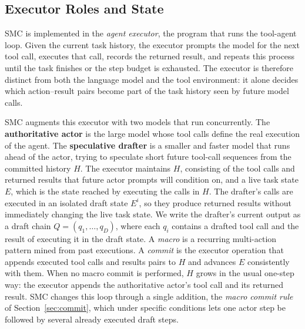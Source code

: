 \subsection{Executor Roles and State}

SMC is implemented in the \emph{agent executor}, the program that runs the tool-agent loop. 
Given the current task history, the executor prompts the model for the next tool call, executes that call, records the returned result, and repeats this process until the task finishes or the step budget is exhausted. The executor is therefore distinct from both the language model and the tool environment: it alone decides which action–result pairs become part of the task history seen by future model calls.

SMC augments this executor with two models that run concurrently. 
The \textbf{authoritative actor} is the large model whose tool calls define the real execution of the agent.  
The \textbf{speculative drafter} is a smaller and faster model that runs ahead of the actor, trying to speculate short future tool-call sequences from the committed history $H$.
The executor maintains $H$, consisting of the tool calls and returned results that future actor prompts will condition on, and a live task state $E$, which is the state reached by executing the calls in $H$. 
The drafter's calls are executed in an isolated draft state $E^i$, so they produce returned results without immediately changing the live task state.
We write the drafter's current output as a draft chain $Q=(q_1,\ldots,q_D)$, where each $q_i$ contains a drafted tool call and the result of executing it in the draft state. 
A \emph{macro} is a recurring multi-action pattern mined from past executions. 
A \emph{commit} is the executor operation that appends executed tool calls and results pairs to $H$ and advances $E$ consistently with them. 
When no macro commit is performed, $H$ grows in the usual one-step way: the executor appends the authoritative actor's tool call and its returned result. 
SMC changes this loop through a single addition, the \emph{macro commit rule} of Section~\ref{sec:commit}, which under specific conditions lets one actor step be followed by several already executed draft steps.

